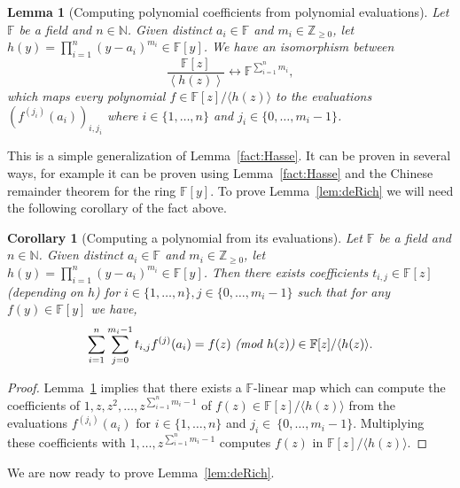 \documentclass[11pt]{article}
\numberwithin{equation}{section}
\newtheorem{lem}[thm]{Lemma}
\newtheorem{cor}[thm]{Corollary}
\def\F{{\mathbb{F}}}
\def\Z{{\mathbb{Z}}}
\def\N{{\mathbb{N}}}
\begin{document}
\begin{lem}[Computing polynomial coefficients from polynomial evaluations]\label{fact:eval}
Let $\F$ be a field and $n\in \N$. Given distinct $a_i\in \F$ and $m_i\in \Z_{\ge 0}$, let $h(y)=\prod_{i=1}^n (y-a_i)^{m_i}\in \F[y]$. We have an isomorphism between
$$\frac{\F[z]}{\left\langle h(z)\right\rangle } \longleftrightarrow \F^{\sum\limits_{i=1}^n m_i},$$
which maps every polynomial $f\in \F[z]/\langle h(z)\rangle$ to the evaluations $(f^{(j_i)}(a_i))_{i,j_i}$ where $i\in \{1,\hdots,n\}$ and $j_i\in \{0,\hdots,m_i-1\}$. 
\end{lem}

This is a simple generalization of Lemma~\ref{fact:Hasse}. It can be proven in several ways, for example it can be proven using Lemma~\ref{fact:Hasse} and the Chinese remainder theorem for the ring $\F[y]$. To prove Lemma~\ref{lem:deRich} we will need the following corollary of the fact above.

\begin{cor}[Computing a polynomial from its evaluations]\label{cor:eval}
Let $\F$ be a field and $n\in \N$. Given distinct $a_i\in \F$ and $m_i\in \Z_{\ge 0}$, let $h(y)=\prod_{i=1}^n (y-a_i)^{m_i}\in \F[y]$. Then there exists coefficients $t_{i,j}\in \F[z]$ (depending on $h$) for $i\in \{1,\hdots,n\},j\in \{0,\hdots,m_i-1\}$ such that for any $f(y)\in \F[y]$ we have,
$$\sum\limits_{i=1}^n \sum\limits_{j=0}^{m_i-1} t_{i,j} f^{(j)}(a_i)=f(z)  \text{ {\em (mod }} h(z)\text{{\em )}} \in  \F[z]/\langle h(z)\rangle.$$
\end{cor}
\begin{proof}
Lemma~\ref{fact:eval} implies that there exists a $\F$-linear map which can compute the coefficients of $1,z,z^2,\hdots, z^{\sum_{i=1}^n m_i-1}$ of $f(z) \in \F[z]/\langle h(z)\rangle$ from the evaluations $f^{(j_i)}(a_i)$ for $i\in \{1,\hdots,n\}$ and $j_i\in~\{0,\hdots,m_i-1\}$. Multiplying these coefficients with $1,\hdots, z^{\sum_{i=1}^n m_i-1}$ computes $f(z)$ in $\F[z]/\langle h(z)\rangle$.
\end{proof}

We are now ready to prove Lemma~\ref{lem:deRich}.
\end{document}
